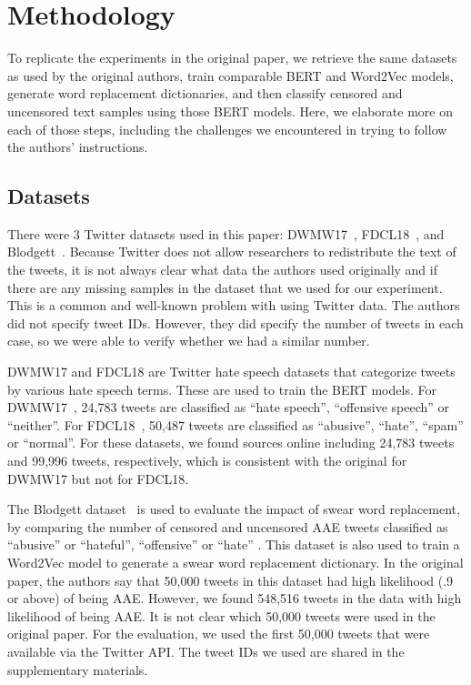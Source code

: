 \section{Methodology}

To replicate the experiments in the original paper, we retrieve the same datasets as used by the original authors, train comparable BERT and Word2Vec models, generate word replacement dictionaries, and then classify censored and uncensored text samples using those BERT models. Here, we elaborate more on each of those steps, including the challenges we encountered in trying to follow the authors' instructions.

\subsection{Datasets}


There were 3 Twitter datasets used in this paper: DWMW17~\cite{davidson}, FDCL18~\cite{founta}, and Blodgett~\cite{blodgett}. Because Twitter does not allow researchers to redistribute the text of the tweets, it is not always clear what data the authors used originally and if there are any missing samples in the dataset that we used for our experiment. This is a common and well-known problem with using Twitter data. The authors did not specify tweet IDs. However, they did specify the number of tweets in each case, so we were able to verify whether we had a similar number.

DWMW17 and FDCL18 are Twitter hate speech datasets that categorize tweets by various hate speech terms. These are used to train the BERT models. For DWMW17~\cite{davidson}, 24,783 tweets are classified as ``hate speech'', ``offensive speech'' or ``neither''. For FDCL18~\cite{founta}, 50,487 tweets are classified as ``abusive'', ``hate'', ``spam'' or ``normal''.  For these datasets, we found sources online including 24,783 tweets and 99,996 tweets, respectively, which is consistent with the original for DWMW17 but not for FDCL18. 

The Blodgett dataset~\cite{blodgett} is used to evaluate the impact of swear word replacement, by comparing the number of censored and uncensored AAE tweets classified as ``abusive'' or ``hateful'', ``offensive'' or ``hate'' . This dataset is also used to train a Word2Vec model to generate a swear word replacement dictionary. In the original paper, the authors say that 50,000 tweets in this dataset had high likelihood (.9 or above) of being AAE. However, we found 548,516 tweets in the data with high likelihood of being AAE. It is not clear which 50,000 tweets were used in the original paper. For the evaluation, we used the first 50,000 tweets that were available via the Twitter API. The tweet IDs we used are shared in the supplementary materials.


